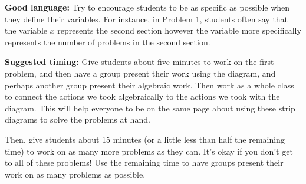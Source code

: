 \documentclass[nooutcomes,noauthor,handout]{ximera}
\begin{document}
\begin{instructorNotes}
{\bf Good language:}  Try to encourage students to be as specific as possible when they define their variables. For instance, in Problem 1, students often say that the variable $x$ represents the second section however the variable more specifically represents the number of problems in the second section. 



{\bf Suggested timing:} Give students about five minutes to work on the first problem, and then have a group present their work using the diagram, and perhaps another group present their algebraic work. Then work as a whole class to connect the actions we took algebraically to the actions we took with the diagram. This will help everyone to be on the same page about using these strip diagrams to solve the problems at hand.

Then, give students about 15 minutes (or a little less than half the remaining time) to work on as many more problems as they can. It's okay if you don't get to all of these problems! Use the remaining time to have groups present their work on as many problems as possible.

\end{instructorNotes}
\end{document}
